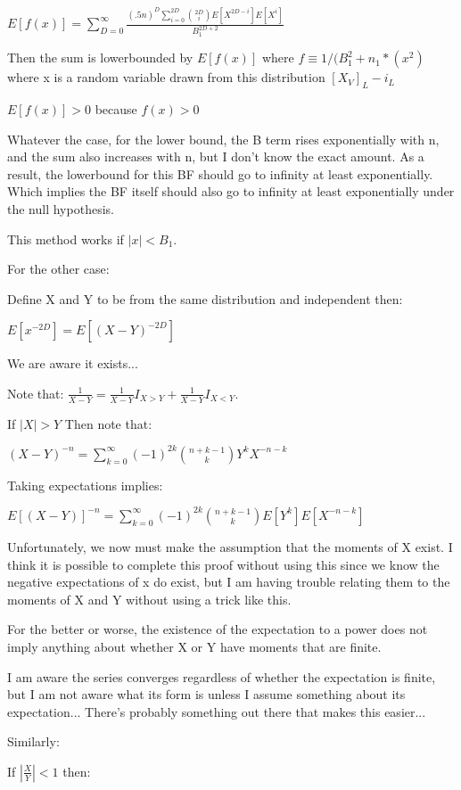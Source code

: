 \documentclass[11pt]{article}
\begin{document}
$E[f(x)] = \sum_{D=0}^\infty \frac{(.5n)^D \sum_{i=0}^{2D} \binom{2D}{i}E[X^{2D-i}]E[X^{i}]}{B_1^{2D+2}}$

Then the sum is lowerbounded by $E[f(x)]$ where $f \equiv 1 / (B_1^2 + n_1*(x^2)$ where x is a random variable drawn from this distribution $[X_V]_{L} - i_L$

$E[f(x)] > 0$ because $f(x) > 0$

Whatever the case, for the lower bound, the B term rises exponentially with n, and the sum also increases with n, but I don't know the exact amount. As a result, the lowerbound for this BF should go to infinity at least exponentially. Which implies the BF itself should also go to infinity at least exponentially under the null hypothesis.

This method works if $|x| < B_1$. 

For the other case:

Define X and Y to be from the same distribution and independent then:

$E[x^{-2D}] = E[(X-Y)^{-2D}]$

We are aware it exists...

Note that: $\frac{1}{X-Y} = \frac{1}{X-Y} I_{X > Y} + \frac{1}{X-Y} I_{X < Y}$. 

If $|X| > Y$ Then note that:

$(X - Y)^{-n} = \sum_{k=0}^{\infty} (-1)^{2k} \binom{n+k-1}{k}{Y^k}{X^{-n-k}}$

Taking expectations implies:

$E[(X - Y)]^{-n} = \sum_{k=0}^{\infty} (-1)^{2k} \binom{n+k-1}{k}E[{Y^k}]E[{X^{-n-k}}]$

Unfortunately, we now must make the assumption that the moments of X exist. I think it is possible to complete this proof without using this since we know the negative expectations of x do exist, but I am having trouble relating them to the moments of X and Y without using a trick like this.

For the better or worse, the existence of the expectation to a power does not imply anything about whether X or Y have moments that are finite.

I am aware the series converges regardless of whether the expectation is finite, but I am not aware what its form is unless I assume something about its expectation... There's probably something out there that makes this easier...

Similarly:

If $|\frac{X}  {Y} | < 1$ then:
\end{document}
